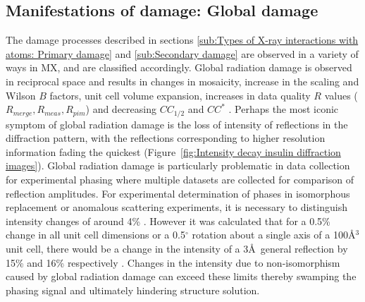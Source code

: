     \subsection{Manifestations of damage: Global damage}
    \label{sub:Manifestations of damage: Global damage}
        The damage processes described in sections \ref{sub:Types of X-ray interactions with atoms: Primary damage} and \ref{sub:Secondary damage} are observed in a variety of ways in MX, and are classified accordingly.
        Global radiation damage is observed in reciprocal space and results in changes in mosaicity, increase in the scaling and Wilson $B$ factors, unit cell volume expansion, increases in data quality $R$ values ($R_{merge}, R_{meas}, R_{pim}$) and decreasing $CC_{1/2}$ and $CC^*$ \cite{garman2010}.
        Perhaps the most iconic symptom of global radiation damage is the loss of intensity of reflections in the diffraction pattern, with the reflections corresponding to higher resolution information fading the quickest (Figure~\ref{fig:Intensity decay insulin diffraction images}).
        Global radiation damage is particularly problematic in data collection for experimental phasing where multiple datasets are collected for comparison of reflection amplitudes.
        For experimental determination of phases in isomorphous replacement or anomalous scattering experiments, it is necessary to distinguish intensity changes of around 4\% \cite{taylor2010}.
        However it was calculated that for a 0.5\% change in all unit cell dimensions or a 0.5$^{\circ}$ rotation about a single axis of a 100\AA$^3$ unit cell, there would be a change in the intensity of a 3\AA\ general reflection by 15\% and 16\% respectively \cite{crick1956}.
        Changes in the intensity due to non-isomorphism caused by global radiation damage can exceed these limits thereby swamping the phasing signal and ultimately hindering structure solution.

